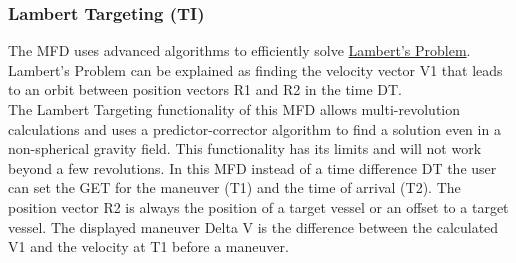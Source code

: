\documentclass[11pt]{article} %
\begin{document}
\newpage
\subsubsection{Lambert Targeting (TI)}

The MFD uses advanced algorithms to efficiently solve \href{https://en.wikipedia.org/wiki/Lambert%27s_problem}{Lambert's Problem}.
Lambert's Problem can be explained as finding the velocity vector V1 that leads to an orbit between position vectors R1 and R2 in the time DT. \\

The Lambert Targeting functionality of this MFD allows multi-revolution calculations and uses a predictor-corrector algorithm to find a solution even in a non-spherical gravity field. This functionality has its limits and will not work beyond a few revolutions. In this MFD instead of a time difference DT the user can set the GET for the maneuver (T1) and the time of arrival (T2). The position vector R2 is always the position of a target vessel or an offset to a target vessel. The displayed maneuver Delta V is the difference between the calculated V1 and the velocity at T1 before a maneuver.\\
\end{document}
